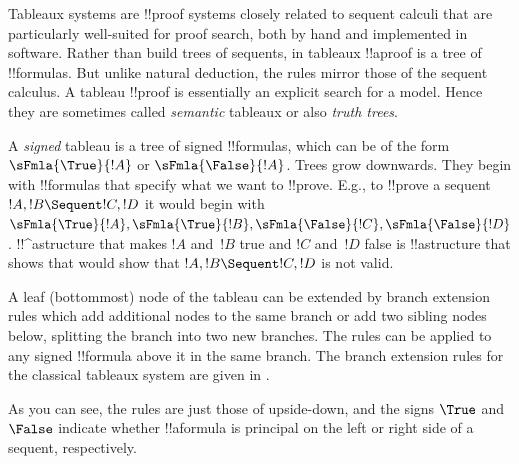 \documentclass[../../../include/open-logic-section]{subfiles}
\begin{document}


Tableaux systems are !!{proof} systems closely related to sequent
calculi that are particularly well-suited for proof search, both by
hand and implemented in software. Rather than build trees of sequents,
in tableaux !!a{proof} is a tree of !!{formula}s. But unlike natural
deduction, the rules mirror those of the sequent calculus. A tableau
!!{proof} is essentially an explicit search for a model. Hence they
are sometimes called \emph{semantic} tableaux or also \emph{truth
trees}.

A \emph{signed} tableau is a tree of signed !!{formula}s, which can be
of the form $\sFmla{\True}{!A}$ or $\sFmla{\False}{!A}$. Trees grow
downwards. They begin with !!{formula}s that specify what we want to
!!{prove}. E.g., to !!{prove} a sequent $!A, !B \Sequent !C, !D$ it
would begin with $\sFmla{\True}{!A}, \sFmla{\True}{!B},
\sFmla{\False}{!C}, \sFmla{\False}{!D}$. !!^a{structure} that makes
$!A$ and~$!B$ true and $!C$ and~$!D$ false is !!a{structure} that
shows that would show that $!A, !B \Sequent !C, !D$ is not valid. 

A leaf (bottommost) node of the tableau can be extended by branch
extension rules which add additional nodes to the same branch or add
two sibling nodes below, splitting the branch into two new branches.
The rules can be applied to any signed !!{formula} above it in the
same branch. The branch extension rules for the classical tableaux
system  are given in .



As you can see, the rules are just those of  upside-down, and
the signs $\True$ and $\False$ indicate whether !!a{formula} is
principal on the left or right side of a sequent, respectively.
\end{document}
